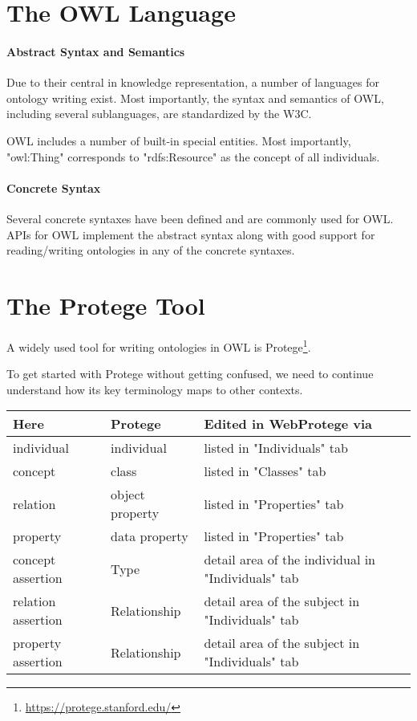 \section{The OWL Language}

\paragraph{Abstract Syntax and Semantics}
Due to their central in knowledge representation, a number of languages for ontology writing exist.
Most importantly, the syntax and semantics of OWL, including several sublanguages, are standardized by the W3C.

OWL includes a number of built-in special entities.
Most importantly, "owl:Thing" corresponds to "rdfs:Resource" as the concept of all individuals.

\paragraph{Concrete Syntax}
Several concrete syntaxes have been defined and are commonly used for OWL.
APIs for OWL implement the abstract syntax along with good support for reading/writing ontologies in any of the concrete syntaxes.

\section{The Protege Tool}

A widely used tool for writing ontologies in OWL is Protege\footnote{\url{https://protege.stanford.edu/}}.

To get started with Protege without getting confused, we need to continue understand how its key terminology maps to other contexts.
\begin{center}
\begin{tabular}{l|ll}
 Here       & Protege & Edited in WebProtege via \\
\hline
 individual & individual & listed in "Individuals" tab\\
 concept    & class   & listed in "Classes" tab  \\
 relation   & object property & listed in "Properties" tab\\
 property   & data property & listed in "Properties" tab\\
 concept assertion & Type & detail area of the individual in "Individuals" tab \\
 relation assertion & Relationship & detail area of the subject in "Individuals" tab \\
 property assertion & Relationship & detail area of the subject in "Individuals" tab \\
\end{tabular}
\end{center}

